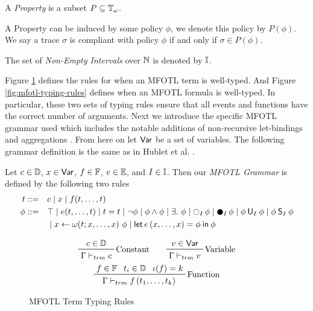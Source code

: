 \begin{definition}
    \label{def:property}
    A \emph{Property} is a subset $P\subseteq \mathbb{T}_\omega$.
\end{definition}

A Property can be induced by some policy $\phi$, we denote this policy by $P(\phi)$.
We say a trace $\sigma$ is compliant with policy $\phi$ if and only if $\sigma \in P(\phi)$.

\begin{definition}
    \label{def:non-empty-intervals}
    The set of \emph{Non-Empty Intervals} over $\mathbb{N}$ is denoted by $\mathbb{I}$.
\end{definition}

Figure \ref{fig:mfotl-term-typing-rules} defines the rules for when an MFOTL
term is well-typed.
And Figure \ref{fig:mfotl-typing-rules} defines when an
MFOTL formula is well-typed.
In particular, these two sets of typing rules ensure that
all events and functions have the correct number of arguments.
Next we introduce the specific MFOTL grammar used 
which includes the notable additions of non-recursive
let-bindings \cite{zingg2022verified} and aggregations
\cite{basin2013monitoring}.
From here on let $\mathsf{Var}$ be a set of variables.
The following grammar definition is the same as in 
Hublet et al. \cite[Section 2.2]{whyenf-2}.

\begin{definition}
    \label{def:mfotl-grammar}
    Let $c \in \mathbb{D}$,
    $x \in \mathsf{Var}$,
    $f \in \mathbb{F}$,
    $e \in \mathbb{E}$,
    and $I \in \mathbb{I}$.
    Then our \emph{MFOTL Grammar} is defined by the following two rules
    \begin{align*}
        t &::= &&c \mid x \mid f(t,\dots,t) \\
        \phi &::= &&\top \mid e(t,\dots,t) \mid t=t \mid \neg \phi \mid
            \phi \wedge \phi \mid \exists.\ \phi \mid \Next_I \phi \mid
            \Prev_I \phi \mid \phi \UUntil_I \phi \mid \phi \Since_I \phi \\
            &&& \mid \Aggreg{x}{\omega}{t}{x,\dots,x}{\phi} \mid
            \LLet{e \left(x,\dots,x \right)}{\phi}{\phi}
    \end{align*}
\end{definition}

\begin{figure}
    \begin{gather*}
        \prftree[r]{Constant}
            {c \in \Domain}
            {\Gamma \vdash_{trm} c} \qquad
        \prftree[r]{Variable}
            {v \in \Variables}
            {\Gamma \vdash_{trm} v} \\
        \prftree[r]{Function}
            {f \in \Functions}
            {t_i \in \Domain}
            {\iota(f) = k}
            {\Gamma \vdash_{trm} f\left(t_1,\dots,t_k\right)}            
    \end{gather*}
    \vspace{-2em}
    \caption{MFOTL Term Typing Rules \label{fig:mfotl-term-typing-rules}}
\end{figure}

